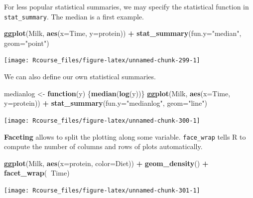 \documentclass[]{book}
\newenvironment{Shaded}{\begin{snugshade}}{\end{snugshade}}
\newcommand{\KeywordTok}[1]{\textcolor[rgb]{0.13,0.29,0.53}{\textbf{#1}}}
\newcommand{\DataTypeTok}[1]{\textcolor[rgb]{0.13,0.29,0.53}{#1}}
\newcommand{\StringTok}[1]{\textcolor[rgb]{0.31,0.60,0.02}{#1}}
\newcommand{\ControlFlowTok}[1]{\textcolor[rgb]{0.13,0.29,0.53}{\textbf{#1}}}
\newcommand{\OperatorTok}[1]{\textcolor[rgb]{0.81,0.36,0.00}{\textbf{#1}}}
\newcommand{\NormalTok}[1]{#1}
\theoremstyle{definition}
\theoremstyle{definition}
\theoremstyle{definition}
\theoremstyle{remark}
\begin{document}
For less popular statistical summaries, we may specify the statistical
function in \texttt{stat\_summary}. The median is a first example.

\begin{Shaded}
\begin{Highlighting}[]
\KeywordTok{ggplot}\NormalTok{(Milk, }\KeywordTok{aes}\NormalTok{(}\DataTypeTok{x=}\NormalTok{Time, }\DataTypeTok{y=}\NormalTok{protein)) }\OperatorTok{+}
\StringTok{  }\KeywordTok{stat_summary}\NormalTok{(}\DataTypeTok{fun.y=}\StringTok{"median"}\NormalTok{, }\DataTypeTok{geom=}\StringTok{"point"}\NormalTok{)}
\end{Highlighting}
\end{Shaded}

\texttt{[image: Rcourse\_files/figure-latex/unnamed-chunk-299-1]}

We can also define our own statistical summaries.

\begin{Shaded}
\begin{Highlighting}[]
\NormalTok{medianlog <-}\StringTok{ }\ControlFlowTok{function}\NormalTok{(y) \{}\KeywordTok{median}\NormalTok{(}\KeywordTok{log}\NormalTok{(y))\}}
\KeywordTok{ggplot}\NormalTok{(Milk, }\KeywordTok{aes}\NormalTok{(}\DataTypeTok{x=}\NormalTok{Time, }\DataTypeTok{y=}\NormalTok{protein)) }\OperatorTok{+}
\StringTok{  }\KeywordTok{stat_summary}\NormalTok{(}\DataTypeTok{fun.y=}\StringTok{"medianlog"}\NormalTok{, }\DataTypeTok{geom=}\StringTok{"line"}\NormalTok{)}
\end{Highlighting}
\end{Shaded}

\texttt{[image: Rcourse\_files/figure-latex/unnamed-chunk-300-1]}

\textbf{Faceting} allows to split the plotting along some variable.
\texttt{face\_wrap} tells R to compute the number of columns and rows of
plots automatically.

\begin{Shaded}
\begin{Highlighting}[]
\KeywordTok{ggplot}\NormalTok{(Milk, }\KeywordTok{aes}\NormalTok{(}\DataTypeTok{x=}\NormalTok{protein, }\DataTypeTok{color=}\NormalTok{Diet)) }\OperatorTok{+}
\StringTok{  }\KeywordTok{geom_density}\NormalTok{() }\OperatorTok{+}
\StringTok{  }\KeywordTok{facet_wrap}\NormalTok{(}\OperatorTok{~}\NormalTok{Time)}
\end{Highlighting}
\end{Shaded}

\texttt{[image: Rcourse\_files/figure-latex/unnamed-chunk-301-1]}
\end{document}
